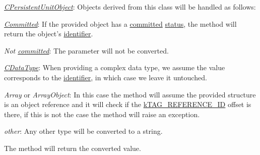 \begin{DoxyItemize}
\item {\itshape \hyperlink{class_c_persistent_unit_object}{C\-Persistent\-Unit\-Object}}\-: Objects derived from this class will be handled as follows\-: 
\begin{DoxyItemize}
\item {\itshape \hyperlink{class_c_persistent_object_a6520a7bcecf3f39fd61ec6d08f736e77}{Committed}}\-: If the provided object has a \hyperlink{class_c_persistent_object_a6520a7bcecf3f39fd61ec6d08f736e77}{committed} \hyperlink{}{status}, the method will return the object's \hyperlink{}{identifier}. 
\item {\itshape Not \hyperlink{class_c_persistent_object_a6520a7bcecf3f39fd61ec6d08f736e77}{committed}}\-: The parameter will not be converted. 
\end{DoxyItemize}
\item {\itshape \hyperlink{class_c_data_type}{C\-Data\-Type}}\-: When providing a complex data type, we assume the value corresponds to the \hyperlink{}{identifier}, in which case we leave it untouched. 
\item {\itshape Array} or {\itshape Array\-Object}\-: In this case the method will assume the provided structure is an object reference and it will check if the \hyperlink{}{k\-T\-A\-G\-\_\-\-R\-E\-F\-E\-R\-E\-N\-C\-E\-\_\-\-I\-D} offset is there, if this is not the case the method will raise an exception. 
\item {\itshape other}\-: Any other type will be converted to a string. 
\end{DoxyItemize}

The method will return the converted value.


